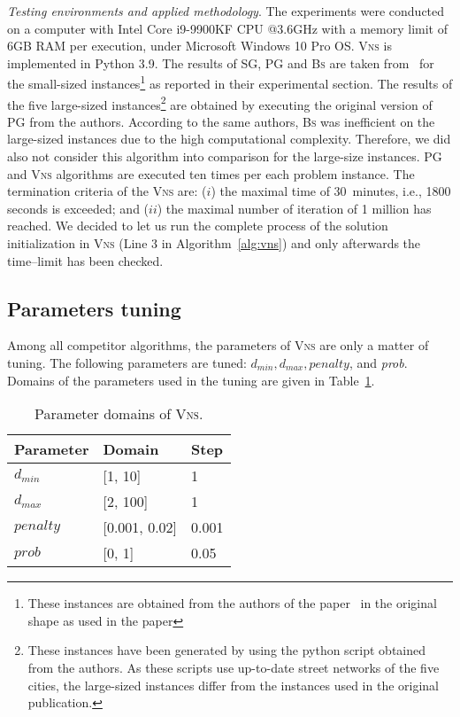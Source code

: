 \documentclass[dvipsnames,format=sigconf,anonymous=true,review=true]{acmart}
\begin{document}
 
 \emph{Testing environments and applied methodology}. The experiments were conducted  on a computer with Intel Core i9-9900KF CPU @3.6GHz with a memory limit of 6GB RAM per execution, under Microsoft Windows 10 Pro OS. \textsc{Vns}  is implemented in Python 3.9. The results of \textsc{SG}, \textsc{PG} and \textsc{Bs} are taken from~\cite{corcoran2021heuristics} for the small-sized instances\footnote{These instances are obtained from the authors of the paper~\cite{corcoran2021heuristics} in the original shape as used in the paper} as reported in their experimental section. The results of the  five large-sized instances\footnote{These instances have been generated by using the python script obtained from the authors. As these  scripts use  up-to-date street networks of the five cities, the large-sized instances differ from the instances used in the original publication. } are obtained by executing the original version of \textsc{PG} from the authors. According to the same authors,  \textsc{Bs} was inefficient  on the large-sized instances due to
 the high computational complexity. Therefore, we did also not consider this algorithm into comparison for the large-size instances.  
 \textsc{PG} and \textsc{Vns} algorithms are executed ten times per each problem instance.  The termination criteria of the \textsc{Vns} are: ($i$) the maximal time of 30~minutes, i.e., 1800 seconds is exceeded; and ($ii$) the maximal number of iteration of 1 million has reached. We decided to let us run the complete process of the solution initialization in \textsc{Vns} (Line 3 in Algorithm~\ref{alg:vns})  and only afterwards the time--limit has been checked.  
\subsection{Parameters tuning}
   Among all competitor algorithms, the parameters of \textsc{Vns} are only a matter of tuning. The following parameters are tuned: $d_{min}, d_{max}, penalty$, and \emph{prob}.  Domains of the parameters used in the tuning are given in Table~\ref{tab:domain_tuning}.
   
    \begin{table}[ht]
    	\caption{Parameter domains of \textsc{Vns}.}  
    	\label{tab:domain_tuning}
   	\begin{tabular}{lll}
    Parameter       & Domain & Step \\ \hline
   	$d_{min}$  &  [1, 10] & 1 \\
   	$d_{max}$  & [2, 100] & 1\\
   	 $penalty$ & [0.001, 0.02]  & 0.001 \\
   	 $prob$    & [0, 1] & 0.05 \\ \hline
   	\end{tabular}
   \end{table}
   
\end{document}
